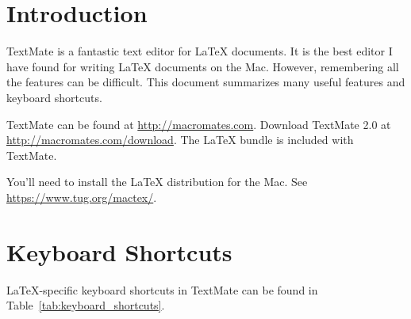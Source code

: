 \documentclass[10pt]{article}
\begin{document}
\maketitle

\begin{abstract}
TextMate is a fantastic editor for \LaTeX{} documents. 
This short paper summarizes many features, including
keyboard shortcuts, 
typsetting, and 
GitHub integration,
available in TextMate's \LaTeX{} bundle.
\end{abstract}

\section{Introduction}
TextMate is a fantastic text editor for \LaTeX{} documents.
It is the best editor I have found for
writing \LaTeX{} documents on the Mac.
However, remembering all the features can be difficult.
This document summarizes many useful features and keyboard shortcuts.

TextMate can be found at \url{http://macromates.com}. 
Download TextMate 2.0 at \url{http://macromates.com/download}. 
The \LaTeX{} bundle is included with TextMate. 

You'll need to install the \LaTeX{} distribution for the Mac.
See \url{https://www.tug.org/mactex/}.


\section{Keyboard Shortcuts} %
\label{sec:keyboard_shortcuts}
\LaTeX{}-specific keyboard shortcuts in TextMate can be found in Table~\ref{tab:keyboard_shortcuts}.
\end{document}
